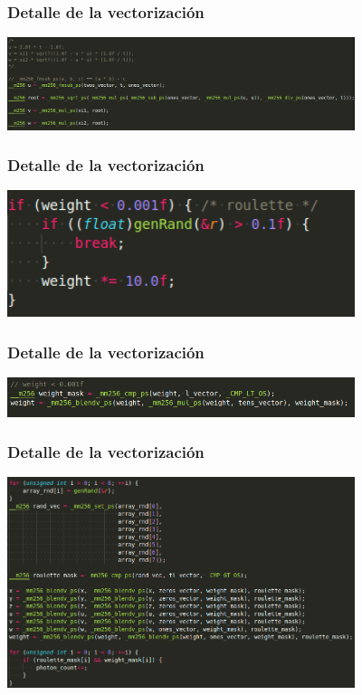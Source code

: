\documentclass{beamer}
\begin{document}
\begin{frame}
    \frametitle{Detalle de la vectorización}
    \includegraphics[width=4in]{imagenes/det_vec9.png}
\end{frame}

\begin{frame}
    \frametitle{Detalle de la vectorización}
    \includegraphics[width=4in]{imagenes/comp_tinymc4.png}
\end{frame}

\begin{frame}
    \frametitle{Detalle de la vectorización}
    \includegraphics[width=4in]{imagenes/det_vec10.png}
\end{frame}
\begin{frame}
    \frametitle{Detalle de la vectorización}
    \includegraphics[width=4in]{imagenes/det_vec11.png}
\end{frame}
\end{document}
